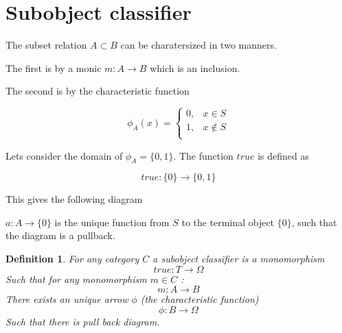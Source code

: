 \documentclass[twoside]{article}
\newtheorem{definition}[theorem]{Definition}
\begin{document}
\section{Subobject classifier}

The subset relation $A \subset B$ can be
charatersized in two manners.

The first is by a monic $m : A \rightarrow B$ which is
an inclusion.

The second is by the characteristic function

$$\phi_A(x) =
  \begin{cases}
    0, & x \in S \\
    1, & x \notin S \\
  \end{cases}$$

Lets consider the domain of $\phi_A = \{0,1\}$.  The function
$true$ is defined as

$$true : \{ 0 \} \rightarrow \{ 0, 1 \} $$

This gives the following diagram

\begin{figure}[H]
       \centering
{}
\end{figure}

$a : A \rightarrow \{ 0 \} $ is the unique function from $S$
to the terminal object $\{ 0 \}$, such that the diagram is a pullback.


\begin{definition}
For any category $C$ a subobject classifier is a monomorphism
$$true : T \rightarrow \Omega $$
Such that for any monomorphism $m \in C$ :
$$ m : A \rightarrow B $$
There exists an unique arrow $\phi$ (the characteristic function)
$$\phi : B \rightarrow \Omega $$
Such that there is pull back diagram.\\

\begin{figure}[H]
       \centering
{}
\end{figure}
\end{definition}




\end{document}
